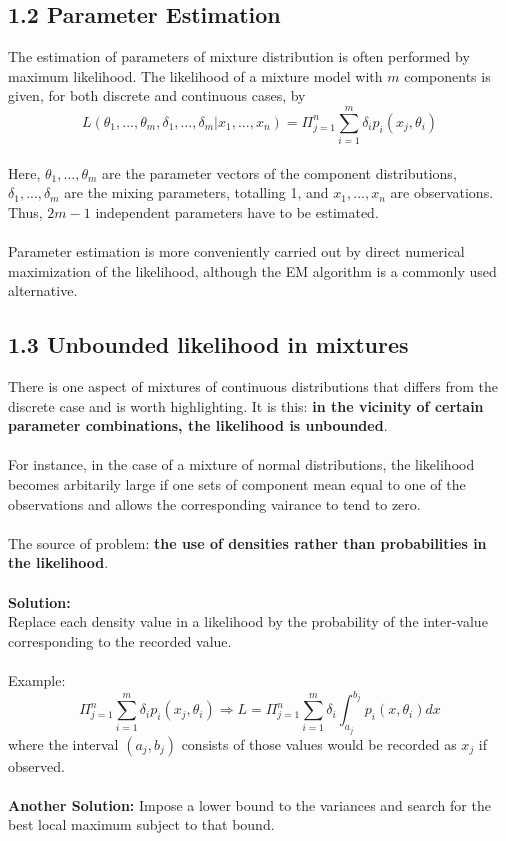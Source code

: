 \documentclass{article}
\begin{document}
\subsection*{1.2 Parameter Estimation}
The estimation of parameters of mixture distribution is often performed by maximum likelihood. The likelihood of a mixture model with $m$ components is given, for both discrete and continuous cases, by
$$L(\theta_1, ..., \theta_m, \delta_1, ..., \delta_m | x_1, ..., x_n) = \Pi_{j=1}^n \sum_{i=1}^m \delta_i p_i(x_j, \theta_i)$$
\\
Here, $\theta_1, ..., \theta_m$ are the parameter vectors of the component distributions, $\delta_1, ..., \delta_m$ are the mixing parameters, totalling 1, and $x_1, ..., x_n$ are observations. Thus, $2m -1$ independent parameters have to be estimated. \\
\\
Parameter estimation is more conveniently carried out by direct numerical maximization of the likelihood, although the EM algorithm is a commonly used alternative. 

\subsection*{1.3 Unbounded likelihood in mixtures}
There is one aspect of mixtures of continuous distributions that differs from the discrete case and is worth highlighting. It is this: \textbf{in the vicinity of certain parameter combinations, the likelihood is unbounded}. \\
\\
For instance, in the case of a mixture of normal distributions, the likelihood becomes arbitarily large if one sets of component mean equal to one of the observations and allows the corresponding vairance to tend to zero. \\
\\
The source of problem: \textbf{the use of densities rather than probabilities in the likelihood}. \\
\\
\textbf{Solution:} \\
Replace each density value in a likelihood by the probability of the inter-value corresponding to the recorded value. \\
\\
Example: 
$$\Pi_{j=1}^{n} \sum_{i=1}^m \delta_i p_i(x_j, \theta_i) \Rightarrow L = \Pi_{j=1}^n \sum_{i=1}^m \delta_i \int_{a_j}^{b_j} p_i(x, \theta_i) dx$$
where the interval $(a_j, b_j)$ consists of those values would be recorded as $x_j$ if observed. \\
\\
\textbf{Another Solution:}
Impose a lower bound to the variances and search for the best local maximum subject to that bound. 
\end{document}
